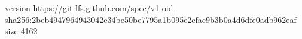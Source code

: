 version https://git-lfs.github.com/spec/v1
oid sha256:2beb4947964943042e34be50be7795a1b095e2cfac9b3b0a4d6dfe0adb962eaf
size 4162
